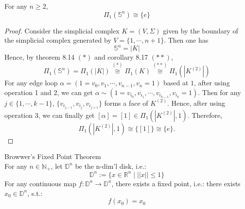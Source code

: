 \begin{proposition}
    For any $n \geq 2$, 
    $$\Pi_1 (\mathbb{S}^n) \cong \{e\}$$
\end{proposition}

\begin{proof}
    Consider the simplicial complex $K= (V,\Sigma)$ given by the boundary of the simplicial complex generated by $V= \{ 1,\cdots, n+1\}$. Then one has
    $$\mathbb{S}^n = |K|$$
    Hence, by theorem 8.14 $(*)$ and corollary 8.17 $(**)$,
    \begin{equation*}
        \Pi_1 (\mathbb{S}^n) = \Pi_1({|K|}) \overset{(*)}{\cong} \Pi_1 (K) \overset{(**)}{\cong} \Pi_1 (|K^{(2)}|) \tag{\#}
    \end{equation*}
    For any edge loop $\alpha = (1= v_0, v_1 ,\cdots, v_{n-1}, v_n=1)$ based at $1$, after using operation 1 and 2, we can get $\alpha \sim (1= v_{i_0}, v_{i_1}, \cdots, v_{i_{k-1}}, v_{i_k}=1)$. Then for any $j \in \{1, \cdots ,k-1\}$, $\{ v_{i_{j-1}}, v_{i_{j}}, v_{i_{j+1}} \}$ forms a face of $K^{(2)}$. Hence, after using operation 3, we can finally get $[\alpha] = [1] \in \Pi_1 (|K^{(2)}|,1)$. Therefore,
    $$\Pi_1 (|K^{(2)}|,1) \cong \{ [1]\} \cong \{ e\}.$$
\end{proof}

\begin{theorem}{Browwer's Fixed Point Theorem}\\
For any $n \in \mathbb{N}_+$, let $\mathbb{D}^n$ be the n-dim'l disk, i.e.:
$$\mathbb{D}^n := \{ x \in \mathbb{R}^n \mid ||x||\leq 1 \}$$
For any continuous map $f: \mathbb{D}^n \to \mathbb{D}^n$, there exists a fixed point, i.e.: there exists $x_0 \in \mathbb{D}^n$, s.t.:
$$f(x_0) = x_0$$
\end{theorem}

